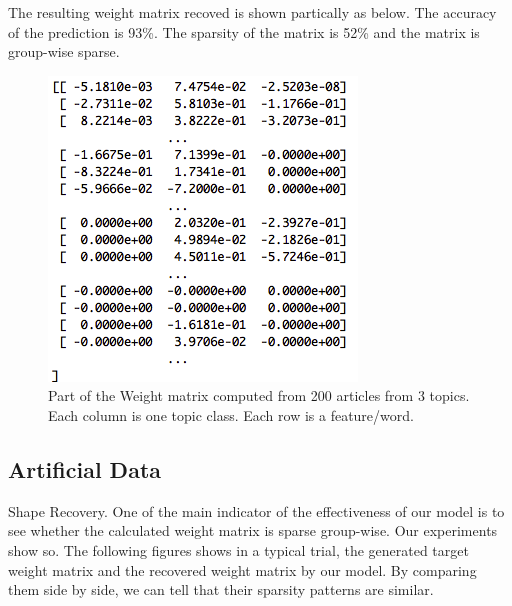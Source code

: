 \documentclass[11pt]{article}
\begin{document}
The resulting weight matrix recoved is shown partically as below. The accuracy of the prediction is 93\%. The sparsity of the matrix is 52\% and the matrix is group-wise sparse.\\

\begin{figure}[ht]
  \centering
  \includegraphics[width=\linewidth]{m4_img}
  \caption{Part of the Weight matrix computed from 200 articles from 3 topics. Each column is one topic class. Each row is a feature/word.}
\end{figure}%


\subsection{Artificial Data}

Shape Recovery. One of the main indicator of the effectiveness of our model is to see whether the calculated weight matrix is sparse group-wise. Our experiments show so. The following figures shows in a typical trial, the generated target weight matrix and the recovered weight matrix by our model. By comparing them side by side, we can tell that their sparsity patterns are similar. 
\end{document}
